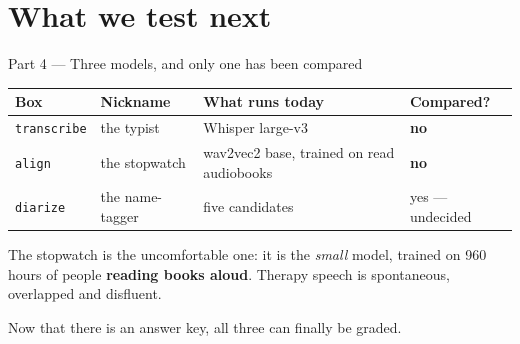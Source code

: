 \documentclass[aspectratio=169]{beamer}
\newcommand{\bigidea}[1]{%
  \vfill
  \begingroup\centering
  \colorbox{warmbg}{\parbox{0.93\textwidth}{\centering \large #1}}%
  \par\endgroup
  \vfill}
\newenvironment{nicetable}[1]
  {\par\vspace{2pt}\begingroup\centering\small
   \renewcommand{\arraystretch}{1.18}%
   \setlength{\tabcolsep}{6pt}\rowcolors{2}{band}{white}%
   \begin{tabular}{#1}\arrayrulecolor{hdr}\toprule}
  {\bottomrule\end{tabular}\par\endgroup\vspace{2pt}}
\newcommand{\hd}[1]{\textcolor{hdr}{\textbf{#1}}}
\begin{document}
\section{What we test next}
\begin{frame}{Part 4 --- Three models, and only one has been compared}

\begin{nicetable}{p{2.6cm}p{2.6cm}p{4.2cm}p{2.4cm}}
\hd{Box} & \hd{Nickname} & \hd{What runs today} & \hd{Compared?} \\ \midrule
\texttt{transcribe} & the typist & Whisper large-v3 & \textcolor{warm}{\textbf{no}} \\
\texttt{align} & the stopwatch & wav2vec2 base, trained on read audiobooks & \textcolor{warm}{\textbf{no}} \\
\texttt{diarize} & the name-tagger & five candidates & yes --- undecided \\
\end{nicetable}

\vspace{0.3em}
The stopwatch is the uncomfortable one: it is the \emph{small} model, trained on 960 hours of
people \textbf{reading books aloud}. Therapy speech is spontaneous, overlapped and disfluent.

\bigidea{Now that there is an answer key, all three can finally be graded.}

\end{frame}
\end{document}
